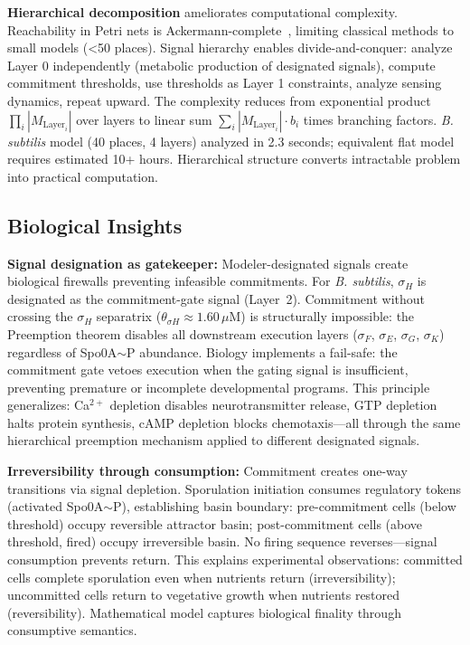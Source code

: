 \documentclass[10pt,letterpaper]{article}
\begin{document}
\textbf{Hierarchical decomposition} ameliorates computational complexity. Reachability in Petri nets is Ackermann-complete~\cite{czerwinski2021}, limiting classical methods to small models (<50 places). Signal hierarchy enables divide-and-conquer: analyze Layer 0 independently (metabolic production of designated signals), compute commitment thresholds, use thresholds as Layer 1 constraints, analyze sensing dynamics, repeat upward. The complexity reduces from exponential product $\prod_i |M_{\text{Layer}_i}|$ over layers to linear sum $\sum_i |M_{\text{Layer}_i}| \cdot b_i$ times branching factors. \textit{B. subtilis} model (40 places, 4 layers) analyzed in 2.3 seconds; equivalent flat model requires estimated 10+ hours. Hierarchical structure converts intractable problem into practical computation.

\subsection{Biological Insights}

\textbf{Signal designation as gatekeeper:} Modeler-designated signals create biological firewalls preventing infeasible commitments. For \textit{B. subtilis}, $\sigma_H$ is designated as the commitment-gate signal (Layer~2). Commitment without crossing the $\sigma_H$ separatrix ($\theta_{\sigma H} \approx 1.60\,\mu$M) is structurally impossible: the Preemption theorem disables all downstream execution layers ($\sigma_F$, $\sigma_E$, $\sigma_G$, $\sigma_K$) regardless of Spo0A$\sim$P abundance. Biology implements a fail-safe: the commitment gate vetoes execution when the gating signal is insufficient, preventing premature or incomplete developmental programs. This principle generalizes: Ca$^{2+}$ depletion disables neurotransmitter release, GTP depletion halts protein synthesis, cAMP depletion blocks chemotaxis---all through the same hierarchical preemption mechanism applied to different designated signals.

\textbf{Irreversibility through consumption:} Commitment creates one-way transitions via signal depletion. Sporulation initiation consumes regulatory tokens (activated Spo0A$\sim$P), establishing basin boundary: pre-commitment cells (below threshold) occupy reversible attractor basin; post-commitment cells (above threshold, fired) occupy irreversible basin. No firing sequence reverses---signal consumption prevents return. This explains experimental observations: committed cells complete sporulation even when nutrients return (irreversibility); uncommitted cells return to vegetative growth when nutrients restored (reversibility). Mathematical model captures biological finality through consumptive semantics.
\end{document}
